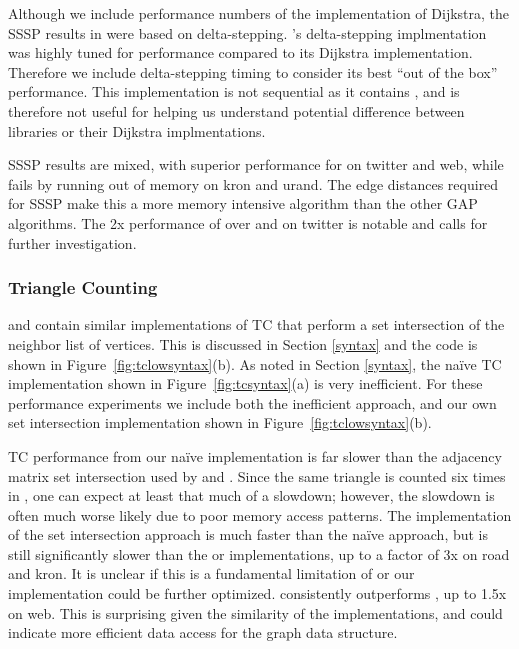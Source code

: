 Although we include performance numbers of the \nwgraph implementation of Dijkstra,
the SSSP results in \cite{REF_nwgraph_paper} were based on delta-stepping.
\nwgraph's delta-stepping implmentation was highly tuned for performance compared
to its Dijkstra implementation.
Therefore we include \nwgraph delta-stepping timing to consider its best
``out of the box'' performance.
This implementation is not sequential as it contains , and is therefore
not useful for helping us understand potential difference between libraries or their
Dijkstra implmentations.

SSSP results are mixed, with superior performance for \bgl on twitter and web,
while \bgl fails by running out of memory on kron and urand.
The edge distances required for SSSP make this a more memory intensive algorithm
than the other GAP algorithms.
The 2x performance of \bgl over \nwgraph and \stdgraph on twitter is notable and calls for further
investigation.

\subsubsection{Triangle Counting}

\nwgraph and \stdgraph contain similar implementations of TC 
that perform a set intersection of the neighbor list of vertices.
This is discussed in Section \ref{syntax} and the \stdgraph code is shown
in Figure~\ref{fig:tclowsyntax}(b).
As noted in Section \ref{syntax}, the na\"ive \bgl TC implementation shown in Figure~\ref{fig:tcsyntax}(a) is very inefficient.
For these performance experiments we include both the inefficient \bgl approach, and our own
\bgl set intersection implementation shown in Figure~\ref{fig:tclowsyntax}(b).

TC performance from our na\"ive \bgl implementation
is far slower than the adjacency matrix set intersection used by \nwgraph
and \stdgraph.
Since the same triangle is counted six times in \bgl,
one can expect at least that much of a slowdown; however, the slowdown
is often much worse likely due to poor memory access patterns.
The \bgl implementation of the set intersection approach is much faster
than the na\"ive approach, but is still significantly slower than the
\nwgraph or \stdgraph implementations, up to a factor of 3x on road and kron.
It is unclear if this is a fundamental limitation of \bgl or our implementation could be
further optimized.
\stdgraph consistently outperforms \nwgraph, up to 1.5x on web.
This is surprising given the similarity of the implementations, and could indicate more
efficient data access for the \stdgraph graph data structure.


